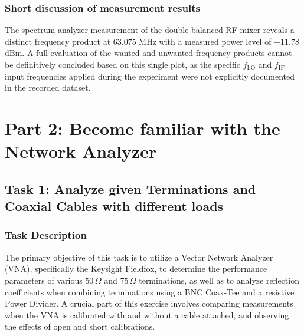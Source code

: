 \FloatBarrier

\subsubsection{Short discussion of measurement results}

The spectrum analyzer measurement of the double-balanced RF mixer reveals a distinct frequency product at $63.075$ MHz with a measured power level of $-11.78$ dBm. A full evaluation of the wanted and unwanted frequency products cannot be definitively concluded based on this single plot, as the specific $f_{\text{LO}}$ and $f_{\text{IF}}$ input frequencies applied during the experiment were not explicitly documented in the recorded dataset.

\section{Part 2: Become familiar with the Network Analyzer}

\subsection{Task 1: Analyze given Terminations and Coaxial Cables with different loads}

\subsubsection{Task Description}
The primary objective of this task is to utilize a Vector Network Analyzer (VNA), specifically the Keysight Fieldfox, to determine the performance parameters of various $50\,\Omega$ and $75\,\Omega$ terminations, as well as to analyze reflection coefficients when combining terminations using a BNC Coax-Tee and a resistive Power Divider. A crucial part of this exercise involves comparing measurements when the VNA is calibrated with and without a cable attached, and observing the effects of open and short calibrations.


